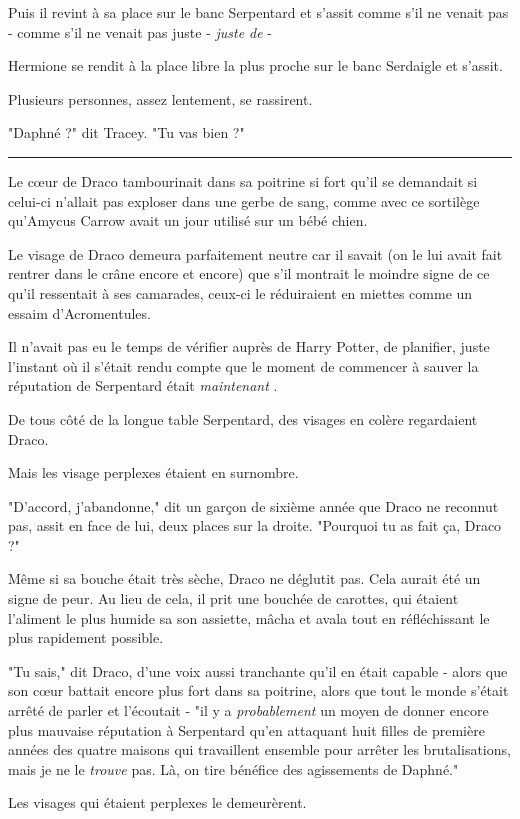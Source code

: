 Puis il revint à sa place sur le banc Serpentard et s'assit comme s'il ne venait pas - comme s'il ne venait pas juste - \emph{juste de}  -

Hermione se rendit à la place libre la plus proche sur le banc Serdaigle et s'assit.

Plusieurs personnes, assez lentement, se rassirent.

"Daphné ?" dit Tracey. "Tu vas bien ?"
\par\noindent\rule{\textwidth}{0.4pt}
Le cœur de Draco tambourinait dans sa poitrine si fort qu'il se demandait si celui-ci n'allait pas exploser dans une gerbe de sang, comme avec ce sortilège qu'Amycus Carrow avait un jour utilisé sur un bébé chien.

Le visage de Draco demeura parfaitement neutre car il savait (on le lui avait fait rentrer dans le crâne encore et encore) que s'il montrait le moindre signe de ce qu'il ressentait à ses camarades, ceux-ci le réduiraient en miettes comme un essaim d'Acromentules.

Il n'avait pas eu le temps de vérifier auprès de Harry Potter, de planifier, juste l'instant où il s'était rendu compte que le moment de commencer à sauver la réputation de Serpentard était \emph{maintenant} .

De tous côté de la longue table Serpentard, des visages en colère regardaient Draco.

Mais les visage perplexes étaient en surnombre.

"D'accord, j'abandonne," dit un garçon de sixième année que Draco ne reconnut pas, assit en face de lui, deux places sur la droite. "Pourquoi tu as fait ça, Draco ?"

Même si sa bouche était très sèche, Draco ne déglutit pas. Cela aurait été un signe de peur. Au lieu de cela, il prit une bouchée de carottes, qui étaient l'aliment le plus humide sa son assiette, mâcha et avala tout en réfléchissant le plus rapidement possible.

"Tu sais," dit Draco, d'une voix aussi tranchante qu'il en était capable - alors que son cœur battait encore plus fort dans sa poitrine, alors que tout le monde s'était arrêté de parler et l'écoutait - "il y a \emph{probablement}  un moyen de donner encore plus mauvaise réputation à Serpentard qu'en attaquant huit filles de première années des quatre maisons qui travaillent ensemble pour arrêter les brutalisations, mais je ne le \emph{trouve}  pas. Là, on tire bénéfice des agissements de Daphné."

Les visages qui étaient perplexes le demeurèrent.

